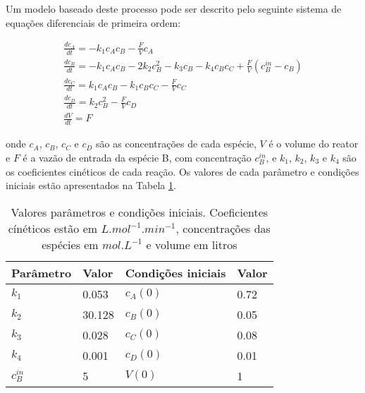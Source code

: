 \documentclass[conference]{IEEEtran}
\begin{document}
 \quad
{} \quad
{} \quad
{} \quad

Um modelo baseado deste processo pode ser descrito pelo seguinte sistema de equações diferenciais de primeira ordem:

\begin{small}
\begin{eqnarray}
	\label{eq:models}	\frac{dc_A}{dt} = -k_1c_Ac_B - \frac{F}{V}c_A \\
	\frac{dc_B}{dt} = -k_1c_Ac_B - 2k_2c_B^2 - k_3c_B - k_4c_Bc_C + \frac{F}{V}(c_B^{in} - c_B) \\
	\frac{dc_C}{dt} = k_1c_Ac_B -k_1c_Bc_C - \frac{F}{V}c_C \\
	\frac{dc_D}{dt} = k_2c_B^2 - \frac{F}{V}c_D \\
	\frac{dV}{dt} = F
	\label{eq:modelf}
\end{eqnarray}
\end{small}
onde $c_A$, $c_B$, $c_C$ e $c_D$ são as concentrações de cada espécie, $V$ é o volume do reator e $F$ é a vazão de entrada da espécie B, com concentração $c_B^{in}$, e $k_1$, $k_2$, $k_3$ e $k_4$ são os coeficientes cinéticos de cada reação. Os valores de cada parâmetro e condições iniciais estão apresentados na Tabela \ref{tab:initial_params}. 

\begin{table}[h!]
	\caption{Valores parâmetros e condições iniciais. Coeficientes cínéticos estão em $L.mol^{-1}.min^{-1}$, concentrações das espécies em $ mol.L^{-1}$ e volume em litros}
	\centering
	\label{tab:initial_params}
	\begin{tabular}{|l|l|l|l|}
		\hline
		\textbf{Parâmetro}  & \textbf{Valor} & \textbf{Condições iniciais} & \textbf{Valor} \\ \hline
		\textbf{$k_1$}      & 0.053          & \textbf{$c_A(0)$}     & 0.72           \\ \hline
		\textbf{$k_2$}      & 30.128         & \textbf{$c_B(0)$}     & 0.05           \\ \hline
		\textbf{$k_3$}      & 0.028          & \textbf{$c_C(0)$}     & 0.08           \\ \hline
		\textbf{$k_4$}      & 0.001          & \textbf{$c_D(0)$}     & 0.01           \\ \hline
		\textbf{$c_B^{in}$} & 5              & \textbf{$V(0)$}       & 1              \\ \hline
	\end{tabular}
\end{table}
\end{document}
